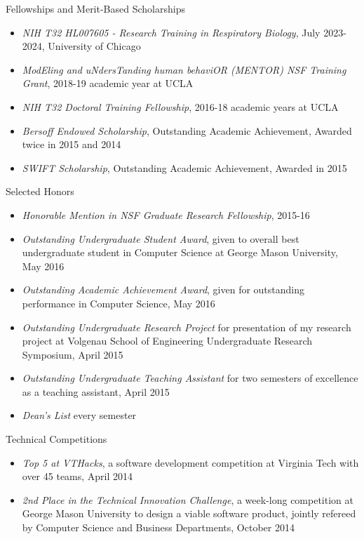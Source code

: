 \documentclass[margin, 10pt]{res} %
\begin{document}
\begin{resume}
Fellowships and Merit-Based Scholarships
\begin{itemize} \itemsep -2pt %
\item {\sl NIH T32 HL007605 - Research Training in Respiratory Biology}, July 2023-2024, University of Chicago
\item {\sl ModEling and uNdersTanding human behaviOR (MENTOR) NSF Training Grant}, 2018-19 academic year at UCLA
\item {\sl NIH T32 Doctoral Training Fellowship}, 2016-18 academic years at UCLA
\item {\sl Bersoff Endowed Scholarship}, Outstanding Academic Achievement, Awarded twice in 2015 and 2014
\item {\sl SWIFT Scholarship}, Outstanding Academic Achievement, Awarded in 2015
\end{itemize}

Selected Honors
\begin{itemize} \itemsep -2pt %
\item {\sl Honorable Mention in NSF Graduate Research Fellowship}, 2015-16
\item {\sl Outstanding Undergraduate Student Award}, given to overall best undergraduate student in Computer Science at George Mason University, May 2016
\item {\sl Outstanding Academic Achievement Award}, given for outstanding performance in Computer Science, May 2016
\item {\sl Outstanding Undergraduate Research Project} for presentation of my research project at Volgenau School of Engineering Undergraduate Research Symposium, April 2015
\item {\sl Outstanding Undergraduate Teaching Assistant} for two semesters of excellence as a teaching assistant, April 2015
\item {\sl Dean's List} every semester
\end{itemize}


Technical Competitions
\begin{itemize} \itemsep -2pt %
\item {\sl Top 5 at VTHacks}, a software development competition at Virginia Tech with over 45 teams, April 2014
\item {\sl 2nd Place in the Technical Innovation Challenge}, a week-long competition at George Mason University to design a viable software product, jointly refereed by Computer Science and Business Departments, October 2014
\end{itemize}




\end{resume}
\end{document}
